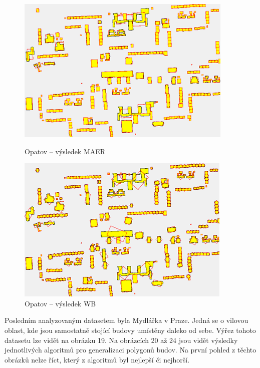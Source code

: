 \documentclass{article}
\begin{document}
\begin{spacing}{1.5}
\begin{figure}[htbp]
  \centering
  \begin{minipage}[b]{0.43\textwidth}
    \includegraphics[width=\textwidth]{images/Opatov_maer.png}
    \caption{Opatov – výsledek MAER}
  \end{minipage}
  \hfill
  \begin{minipage}[b]{0.43\textwidth}
    \includegraphics[width=\textwidth]{images/Opatov_wb.png}
    \caption{Opatov – výsledek WB}
  \end{minipage}
\end{figure}

\newpage
Posledním analyzovaným datasetem byla Mydlářka v Praze. Jedná se o vilovou oblast, kde jsou samostatně stojící budovy umístěny daleko od sebe. Výřez tohoto datasetu lze vidět na obrázku 19. Na obrázcích 20 až 24 jsou vidět výsledky jednotlivých algoritmů pro generalizaci polygonů budov. Na první pohled z těchto obrázků nelze říct, který z algoritmů byl nejlepší či nejhorší.


\end{spacing}
\end{document}
